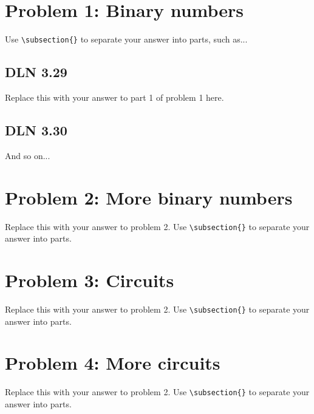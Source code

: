 \documentclass[titlepage]{article}
\begin{document}
 \maketitle

\section{Problem 1: Binary numbers}

Use \verb|\subsection{}| to separate your answer into parts, such as...

\subsection{DLN 3.29}  %

Replace this with your answer to part 1 of problem 1 here.

\subsection{DLN 3.30} 

And so on...


\section{Problem 2: More binary numbers}

Replace this with your answer to problem 2.  Use \verb|\subsection{}| to separate your answer into parts.

\section{Problem 3: Circuits}

Replace this with your answer to problem 2.  Use \verb|\subsection{}| to separate your answer into parts.

\section{Problem 4: More circuits}

Replace this with your answer to problem 2.  Use \verb|\subsection{}| to separate your answer into parts.
\end{document}
